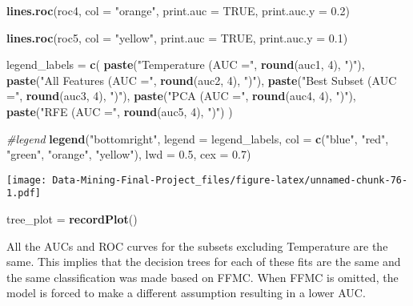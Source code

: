 \documentclass[
]{article}
\newenvironment{Shaded}{\begin{snugshade}}{\end{snugshade}}
\newcommand{\AttributeTok}[1]{\textcolor[rgb]{0.13,0.29,0.53}{#1}}
\newcommand{\CommentTok}[1]{\textcolor[rgb]{0.56,0.35,0.01}{\textit{#1}}}
\newcommand{\ConstantTok}[1]{\textcolor[rgb]{0.56,0.35,0.01}{#1}}
\newcommand{\DecValTok}[1]{\textcolor[rgb]{0.00,0.00,0.81}{#1}}
\newcommand{\FloatTok}[1]{\textcolor[rgb]{0.00,0.00,0.81}{#1}}
\newcommand{\FunctionTok}[1]{\textcolor[rgb]{0.13,0.29,0.53}{\textbf{#1}}}
\newcommand{\NormalTok}[1]{#1}
\newcommand{\OtherTok}[1]{\textcolor[rgb]{0.56,0.35,0.01}{#1}}
\newcommand{\StringTok}[1]{\textcolor[rgb]{0.31,0.60,0.02}{#1}}
\begin{document}
\begin{Shaded}
\begin{Highlighting}[]
\FunctionTok{lines.roc}\NormalTok{(roc4, }\AttributeTok{col =} \StringTok{"orange"}\NormalTok{, }\AttributeTok{print.auc =} \ConstantTok{TRUE}\NormalTok{, }\AttributeTok{print.auc.y =} \FloatTok{0.2}\NormalTok{)}

\FunctionTok{lines.roc}\NormalTok{(roc5, }\AttributeTok{col =} \StringTok{"yellow"}\NormalTok{, }\AttributeTok{print.auc =} \ConstantTok{TRUE}\NormalTok{, }\AttributeTok{print.auc.y =} \FloatTok{0.1}\NormalTok{)}

\NormalTok{legend\_labels }\OtherTok{=} \FunctionTok{c}\NormalTok{(}
  \FunctionTok{paste}\NormalTok{(}\StringTok{"Temperature (AUC ="}\NormalTok{, }\FunctionTok{round}\NormalTok{(auc1, }\DecValTok{4}\NormalTok{), }\StringTok{")"}\NormalTok{),}
  \FunctionTok{paste}\NormalTok{(}\StringTok{"All Features (AUC ="}\NormalTok{, }\FunctionTok{round}\NormalTok{(auc2, }\DecValTok{4}\NormalTok{), }\StringTok{")"}\NormalTok{),}
  \FunctionTok{paste}\NormalTok{(}\StringTok{"Best Subset (AUC ="}\NormalTok{, }\FunctionTok{round}\NormalTok{(auc3, }\DecValTok{4}\NormalTok{), }\StringTok{")"}\NormalTok{),}
  \FunctionTok{paste}\NormalTok{(}\StringTok{"PCA (AUC ="}\NormalTok{, }\FunctionTok{round}\NormalTok{(auc4, }\DecValTok{4}\NormalTok{), }\StringTok{")"}\NormalTok{),}
  \FunctionTok{paste}\NormalTok{(}\StringTok{"RFE (AUC ="}\NormalTok{, }\FunctionTok{round}\NormalTok{(auc5, }\DecValTok{4}\NormalTok{), }\StringTok{")"}\NormalTok{)}
\NormalTok{)}

\CommentTok{\#legend}
\FunctionTok{legend}\NormalTok{(}\StringTok{"bottomright"}\NormalTok{, }\AttributeTok{legend =}\NormalTok{ legend\_labels, }\AttributeTok{col =} \FunctionTok{c}\NormalTok{(}\StringTok{"blue"}\NormalTok{, }\StringTok{"red"}\NormalTok{, }\StringTok{"green"}\NormalTok{, }\StringTok{"orange"}\NormalTok{, }\StringTok{"yellow"}\NormalTok{), }\AttributeTok{lwd =} \FloatTok{0.5}\NormalTok{, }\AttributeTok{cex =} \FloatTok{0.7}\NormalTok{)}
\end{Highlighting}
\end{Shaded}

\texttt{[image: Data-Mining-Final-Project\_files/figure-latex/unnamed-chunk-76-1.pdf]}

\begin{Shaded}
\begin{Highlighting}[]
\NormalTok{tree\_plot }\OtherTok{=} \FunctionTok{recordPlot}\NormalTok{()}
\end{Highlighting}
\end{Shaded}

All the AUCs and ROC curves for the subsets excluding Temperature are
the same. This implies that the decision trees for each of these fits
are the same and the same classification was made based on FFMC. When
FFMC is omitted, the model is forced to make a different assumption
resulting in a lower AUC.
\end{document}
